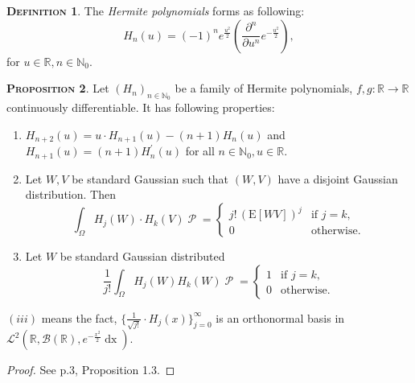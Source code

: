 \documentclass[a4paper, twoside, 11pt]{article}
\theoremstyle{definition}
\newtheorem{definition}{\scshape Definition}[section]
\newtheorem{proposition}[definition]{\scshape Proposition}
\begin{document}
  \begin{definition}
	The \emph{Hermite polynomials} forms as following:
	\begin{equation}
	  H_n(u) = (-1)^n e^{\frac{u^2}{2}} (\frac{\partial^n }{\partial u^n}e^{-\frac{u^2}{2}}),
	  \label{sec:hermite}
	\end{equation}
	for $u\in \mathbb{R}, n\in \mathbb{N}_0$. 
  \end{definition}
  \begin{proposition}
	Let $(H_n)_{n\in \mathbb{N}_0}$ be a family of Hermite polynomials, $f, g: \mathbb{R}\rightarrow \mathbb{R}$ continuously differentiable. It has following properties: 
	\begin{enumerate}[topsep=0pt, itemsep=-1ex, partopsep=1ex, parsep=1ex, label=(\roman*)]
	  \item  $H_{n+2}(u)=u\cdot H_{n+1}(u) - (n+1)H_n(u)$  and $H_{n+1}(u)= (n+1)H^{'}_n(u)$ for all $n\in\mathbb{N}_0, u\in\mathbb{R}$.
	  \item Let $W, V$ be standard Gaussian such that $(W, V)$ have a disjoint Gaussian distribution. Then
		\begin{equation*}
		  \int_{\Omega} H_j(W)\cdot H_k(V) \mathop{\mathcal{P}} = \begin{cases} j!\,(\mathrm{E}[WV])^j & \mbox{if } j=k,\\
			0 &\text{otherwise}.
		  \end{cases}
		\end{equation*}
	  \item Let $W$ be standard Gaussian distributed
		\begin{equation*}
		  \frac{1}{j!} \int_\Omega H_j(W) H_k(W) \mathop{\mathcal{P}} = \begin{cases} 1 & \mbox{if } j=k,\\
			0 & \text{otherwise}.
		  \end{cases}
		\end{equation*}
  \end{enumerate}
  $(iii)$ means the fact, $\{\frac{1}{\sqrt{j!}}\cdot H_j(x)\}_{j=0}^{\infty}$ is an orthonormal basis in $\mathcal{L}^2(\mathbb{R}, \mathscr{B}(\mathbb{R}), e^{-\frac{x^2}{2}}\mathop{dx})$.
		  \label{sec:herpro}
  \end{proposition}
  \begin{proof}
	See \cite{nourdin} p.3, Proposition 1.3.
  \end{proof}
\end{document}

